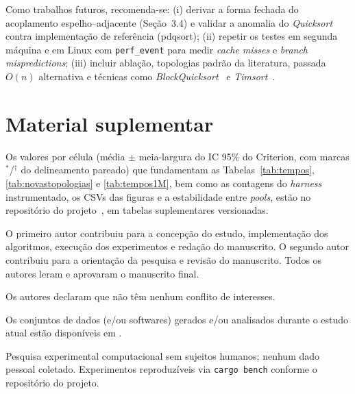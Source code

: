 \documentclass[portuguese]{sbc2025}%
\begin{document}
Como trabalhos futuros, recomenda-se: (i) derivar a forma fechada do acoplamento espelho--adjacente (Seção~3.4) e validar a anomalia do \emph{Quicksort} contra implementação de referência (pdqsort); (ii) repetir os testes em segunda máquina e em Linux com \texttt{perf\_event} para medir \emph{cache misses} e \emph{branch mispredictions}; (iii) incluir ablação, topologias padrão da literatura, passada $O(n)$ alternativa e técnicas como \emph{BlockQuicksort}~\citep{edelkamp_blockquicksort_2016} e \emph{Timsort}~\citep{auger_timsort_2018}.

\appendix
\section{Material suplementar}

Os valores por célula (média $\pm$ meia-largura do IC 95\% do Criterion, com marcas $^{*}$/$^{\dagger}$ do delineamento pareado) que fundamentam as Tabelas~\ref{tab:tempos}, \ref{tab:novastopologias} e \ref{tab:tempos1M}, bem como as contagens do \emph{harness} instrumentado, os CSVs das figuras e a estabilidade entre \emph{pools}, estão no repositório do projeto~\citep{nascimento_repositorio_2026}, em tabelas suplementares versionadas.

\begin{declarations}

\begin{contributions}
O primeiro autor contribuiu para a concepção do estudo, implementação dos algoritmos, execução dos experimentos e redação do manuscrito. O segundo autor contribuiu para a orientação da pesquisa e revisão do manuscrito. Todos os autores leram e aprovaram o manuscrito final.
\end{contributions}

\begin{interests}
Os autores declaram que não têm nenhum conflito de interesses.
\end{interests}

\begin{materials}
Os conjuntos de dados (e/ou softwares) gerados e/ou analisados durante o estudo atual estão disponíveis em \citep{nascimento_repositorio_2026}.
\end{materials}

\begin{furtherinformation}
Pesquisa experimental computacional sem sujeitos humanos; nenhum dado pessoal coletado. Experimentos reproduzíveis via \texttt{cargo bench} conforme o repositório do projeto.
\end{furtherinformation}
\end{declarations}


\renewcommand*{\bibfont}{\small}

\end{document}
